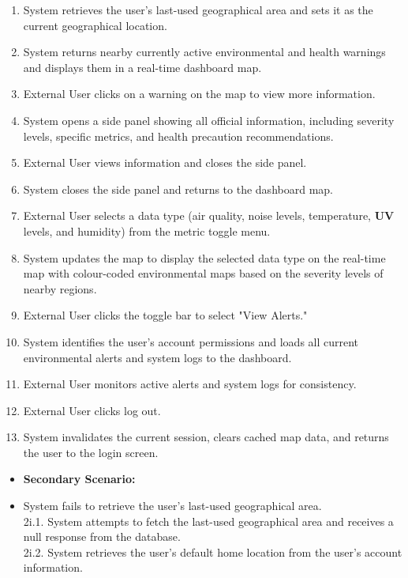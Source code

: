 \documentclass[]{article}
\begin{document}
\begin{enumerate}[{\bf BE1.}]
\begin{enumerate}[1.]
			\item System retrieves the user's last-used geographical area and sets it as the current geographical location.
			\item System returns nearby currently active environmental and health warnings and displays them in a real-time dashboard map.
			\item External User clicks on a warning on the map to view more information.
			\item System opens a side panel showing all official information, including severity levels, specific metrics, and health precaution recommendations.
			\item External User views information and closes the side panel.
			\item System closes the side panel and returns to the dashboard map.
			\item External User selects a data type (air quality, noise levels, temperature, \textbf{UV} levels, and humidity) from the metric toggle menu.
			\item System updates the map to display the selected data type on the real-time map with colour-coded environmental maps based on the severity levels of nearby regions.
			\item External User clicks the toggle bar to select "View Alerts."
			\item System identifies the user's account permissions and loads all current environmental alerts and system logs to the dashboard.
			\item External User monitors active alerts and system logs for consistency.
			\item External User clicks log out.
			\item System invalidates the current session, clears cached map data, and returns the user to the login screen.
		\end{enumerate}
		\begin{itemize}
			\item[] {\bf Secondary Scenario:}
			\item[2i.] System fails to retrieve the user's last-used geographical area. \\
			\hspace{1cm}2i.1. System attempts to fetch the last-used geographical area and receives a null response from the database. \\
			\hspace{1cm}2i.2. System retrieves the user's default home location from the user's account information. \\

\end{itemize}
\end{enumerate}
\end{document}
